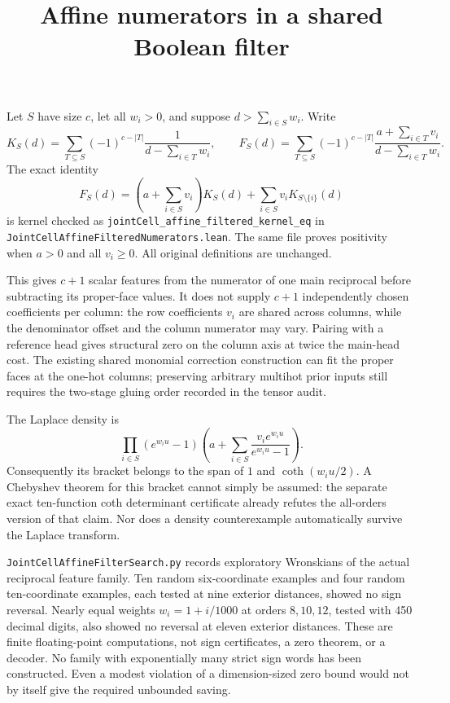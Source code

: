 \documentclass{article}
\begin{document}
\title{Affine numerators in a shared Boolean filter}
\maketitle

Let $S$ have size $c$, let all $w_i>0$, and suppose $d>\sum_{i\in S}w_i$.
Write
\[
 K_S(d)=\sum_{T\subseteq S}(-1)^{c-|T|}
       \frac1{d-\sum_{i\in T}w_i},\qquad
 F_S(d)=\sum_{T\subseteq S}(-1)^{c-|T|}
       \frac{a+\sum_{i\in T}v_i}{d-\sum_{i\in T}w_i}.
\]
The exact identity
\[
 F_S(d)=\left(a+\sum_{i\in S}v_i\right)K_S(d)
             +\sum_{i\in S}v_iK_{S\setminus\{i\}}(d)
\]
is kernel checked as
\texttt{jointCell\_affine\_filtered\_kernel\_eq} in
\texttt{JointCellAffineFilteredNumerators.lean}.
The same file proves positivity when $a>0$ and all $v_i\geq0$.
All original definitions are unchanged.

This gives $c+1$ scalar features from the numerator of one main reciprocal
before subtracting its proper-face values. It does not supply $c+1$
independently chosen coefficients per column: the row coefficients $v_i$
are shared across columns, while the denominator offset and the column
numerator may vary. Pairing with a reference head gives structural zero on
the column axis at twice the main-head cost. The existing shared monomial
correction construction can fit the proper faces at the one-hot columns;
preserving arbitrary multihot prior inputs still requires the two-stage
gluing order recorded in the tensor audit.

The Laplace density is
\[
 \prod_{i\in S}(e^{w_i u}-1)
 \left(a+\sum_{i\in S}\frac{v_i e^{w_i u}}{e^{w_i u}-1}\right).
\]
Consequently its bracket belongs to the span of $1$ and
$\coth(w_i u/2)$. A Chebyshev theorem for this bracket cannot simply be
assumed: the separate exact ten-function coth determinant certificate
already refutes the all-orders version of that claim. Nor does a density
counterexample automatically survive the Laplace transform.

\texttt{JointCellAffineFilterSearch.py} records exploratory Wronskians of
the actual reciprocal feature family. Ten random six-coordinate examples
and four random ten-coordinate examples, each tested at nine exterior
distances, showed no sign reversal. Nearly equal weights
$w_i=1+i/1000$ at orders $8,10,12$, tested with 450 decimal digits, also
showed no reversal at eleven exterior distances. These are finite
floating-point computations, not sign certificates, a zero theorem, or a
decoder. No family with exponentially many strict sign words has been
constructed. Even a modest violation of a dimension-sized zero bound
would not by itself give the required unbounded saving.
\end{document}
